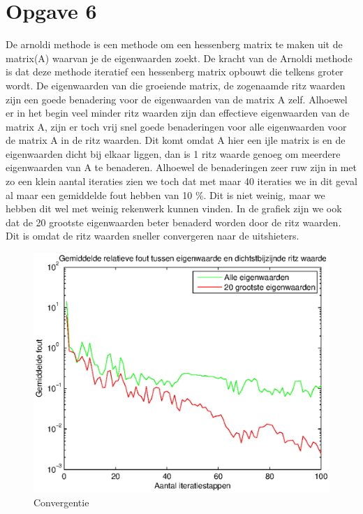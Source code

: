 \documentclass[]{article}
\newcommand{\opgave}[1]{\section*{Opgave #1}}
\begin{document}
\opgave6


De arnoldi methode is een methode om een hessenberg matrix te maken uit de matrix(A) waarvan je de eigenwaarden zoekt. De kracht van de Arnoldi methode is dat deze methode iteratief een hessenberg matrix opbouwt die telkens groter wordt. De eigenwaarden van die groeiende matrix, de zogenaamde ritz waarden zijn een goede benadering voor de eigenwaarden van de matrix A zelf. Alhoewel er in het begin veel minder ritz waarden zijn dan effectieve eigenwaarden van de matrix A, zijn er toch vrij snel goede benaderingen voor alle eigenwaarden voor de matrix A in de ritz waarden. Dit komt omdat A hier een ijle matrix is en de eigenwaarden dicht bij elkaar liggen, dan is 1 ritz waarde genoeg om meerdere eigenwaarden van A te benaderen. Alhoewel de benaderingen zeer ruw zijn in met zo een klein aantal iteraties zien we toch dat met maar 40 iteraties we in dit geval al maar een gemiddelde fout hebben van 10 $\%$. Dit is niet weinig, maar we hebben dit wel met weinig rekenwerk kunnen vinden. In de grafiek zijn we ook dat de 20 grootste eigenwaarden beter benaderd worden door de ritz waarden. Dit is omdat de ritz waarden sneller convergeren naar de uitshieters. 

\begin{figure}
\noindent \includegraphics[width=1\linewidth]{Opgave6.eps}
\caption{Convergentie}
\label{figuurtje}
\end{figure}
\end{document}

